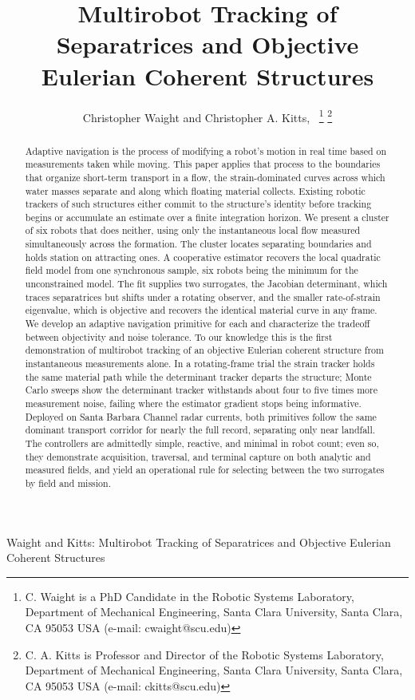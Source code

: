 \documentclass[lettersize,journal]{IEEEtran}
\begin{document}
\title{Multirobot Tracking of Separatrices and
Objective Eulerian Coherent Structures}

\author{Christopher Waight and Christopher A. Kitts,~
\thanks{C. Waight is a PhD Candidate in the Robotic Systems Laboratory, Department of Mechanical Engineering, Santa Clara University, Santa Clara, CA 95053 USA (e-mail: cwaight@scu.edu)}
\thanks{C. A. Kitts is Professor and Director of the Robotic Systems Laboratory, Department of Mechanical Engineering, Santa Clara University, Santa Clara, CA 95053 USA (e-mail: ckitts@scu.edu)}
}
%
{Waight and Kitts: Multirobot Tracking of Separatrices and Objective Eulerian Coherent Structures}

\maketitle

\begin{abstract}
Adaptive navigation is the process of modifying a robot's motion in
real time based on measurements taken while moving. This paper applies
that process to the boundaries that organize short-term transport in a
flow, the strain-dominated curves across which water masses separate
and along which floating material collects. Existing robotic trackers
of such structures either commit to the structure's identity before
tracking begins or accumulate an estimate over a finite integration
horizon. We present a cluster of six robots that does neither, using
only the instantaneous local flow measured simultaneously across the
formation. The cluster locates separating boundaries and holds station
on attracting ones. A cooperative estimator recovers the local quadratic field
model from one synchronous sample, six robots being the minimum for
the unconstrained model. The fit supplies two surrogates, the Jacobian
determinant, which traces separatrices but shifts under a rotating
observer, and the smaller rate-of-strain eigenvalue, which is
objective and recovers the identical material curve in any frame. We
develop an adaptive navigation primitive for each and characterize the
tradeoff between objectivity and noise tolerance. To our knowledge
this is the first demonstration of multirobot tracking of an objective
Eulerian coherent structure from instantaneous measurements alone. In a
rotating-frame trial the strain tracker holds the same material path
while the determinant tracker departs the structure; Monte Carlo
sweeps show the determinant tracker withstands about four to five
times more measurement noise, failing where the estimator gradient
stops being informative. Deployed on Santa Barbara Channel radar
currents, both primitives follow the same dominant transport corridor
for nearly the full record, separating only near landfall. The
controllers are admittedly simple, reactive, and minimal in robot
count; even so, they demonstrate acquisition, traversal, and terminal
capture on both analytic and measured fields, and yield an operational
rule for selecting between the two surrogates by field and mission.
\end{abstract}
\end{document}
